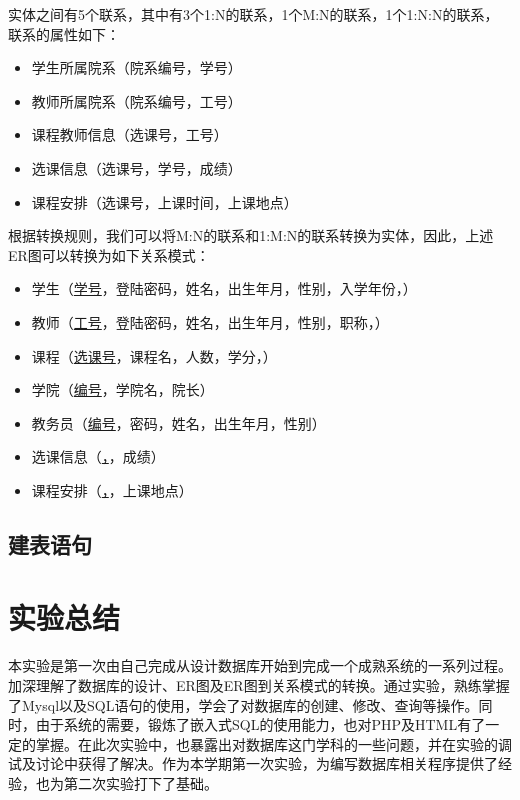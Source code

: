 \documentclass[a4paper, 11pt, nofonts, nocap, fancyhdr]{ctexart}
\begin{document}
实体之间有5个联系，其中有3个1:N的联系，1个M:N的联系，1个1:N:N的联系，联系的属性如下：
\begin{itemize}[leftmargin=4em]
    \item 学生所属院系（院系编号，学号）
    \item 教师所属院系（院系编号，工号）
    \item 课程教师信息（选课号，工号）
    \item 选课信息（选课号，学号，成绩）
    \item 课程安排（选课号，上课时间，上课地点）
\end{itemize}

根据转换规则，我们可以将M:N的联系和1:M:N的联系转换为实体，因此，上述ER图可以转换为如下关系模式：
\begin{itemize}[leftmargin=4em]
    \item 学生（\underline{学号}，登陆密码，姓名，出生年月，性别，入学年份，）
    \item 教师（\underline{工号}，登陆密码，姓名，出生年月，性别，职称，）
    \item 课程（\underline{选课号}，课程名，人数，学分，）
    \item 学院（\underline{编号}，学院名，院长）
    \item 教务员（\underline{编号}，密码，姓名，出生年月，性别）
    \item 选课信息（\underline{，}，成绩）
    \item 课程安排（\underline{，}，上课地点）
\end{itemize}

\subsection{建表语句}



\section{实验总结}

本实验是第一次由自己完成从设计数据库开始到完成一个成熟系统的一系列过程。加深理解了数据库的设计、ER图及ER图到关系模式的转换。通过实验，熟练掌握了Mysql以及SQL语句的使用，学会了对数据库的创建、修改、查询等操作。同时，由于系统的需要，锻炼了嵌入式SQL的使用能力，也对PHP及HTML有了一定的掌握。在此次实验中，也暴露出对数据库这门学科的一些问题，并在实验的调试及讨论中获得了解决。作为本学期第一次实验，为编写数据库相关程序提供了经验，也为第二次实验打下了基础。
\end{document}
